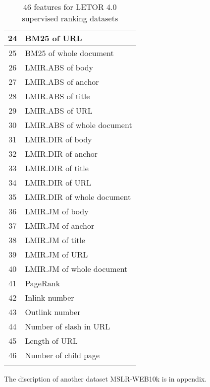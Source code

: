 \begin{longtable}{|c|l|}
24               & BM25 of URL                             \\ \hline
25               & BM25 of whole document                  \\ \hline
26               & LMIR.ABS of body                        \\ \hline
27               & LMIR.ABS of anchor                      \\ \hline
28               & LMIR.ABS of title                       \\ \hline
29               & LMIR.ABS of URL                         \\ \hline
30               & LMIR.ABS of whole document              \\ \hline
31               & LMIR.DIR of body                        \\ \hline
32               & LMIR.DIR of anchor                      \\ \hline
33               & LMIR.DIR of title                       \\ \hline
34               & LMIR.DIR of URL                         \\ \hline
35               & LMIR.DIR of whole document              \\ \hline
36               & LMIR.JM of body                         \\ \hline
37               & LMIR.JM of anchor                       \\ \hline
38               & LMIR.JM of title                        \\ \hline
39               & LMIR.JM of URL                          \\ \hline
40               & LMIR.JM of whole document               \\ \hline
41               & PageRank                                \\ \hline
42               & Inlink number                           \\ \hline
43               & Outlink number                          \\ \hline
44               & Number of slash in URL                  \\ \hline
45               & Length of URL                           \\ \hline
46               & Number of child page                    \\ \hline
\caption{46 features for LETOR 4.0 supervised ranking datasets}\label{tab:features}
\end{longtable}
The discription of another dataset MSLR-WEB10k is in appendix.

